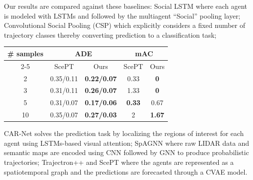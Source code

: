 \documentclass{article}
\begin{document}
% 
\label{sec:result}
Our results are compared against these baselines: Social LSTM \cite{7780479} where each agent is modeled with LSTMs and followed by the multiagent “Social” pooling layer; Convolutional Social Pooling (CSP) \cite{Deo_2018} which explicitly considers a fixed number of trajectory classes thereby converting prediction to a classification task;
  \begin{table}\vspace{-8pt}
 \begin{threeparttable}
    \begin{tabular}{ccccc}
   
\toprule
\multirow{ 2}{*}{\# samples}  &
\multicolumn{2}{c}{ADE} & \multicolumn{2}{c}{mAC}\\
\cmidrule{2-5}
 & ScePT  & Ours & ScePT  & Ours\\
\midrule

 2 &
0.35/0.11 & \textbf{0.22/0.07} & 0.33  & \textbf{0} \\



 3 &
0.31/0.11 & \textbf{0.26/0.07} & 1.33  & \textbf{0} 


\\
 5 & 0.31/0.07 & \textbf{0.17/0.06} &
\textbf{0.33}  & 0.67
\\ 10 & 0.35/0.07 & \textbf{0.27/0.03}
& 2 &\textbf{ 1.67}
\\

\bottomrule
\end{tabular}
\label{table:results}

\end{threeparttable}\vspace{-10pt}
\end{table}
 CAR-Net \cite{sadeghian2018carnet} solves the prediction task by localizing the regions of interest for each agent using LSTMs-based visual attention; SpAGNN \cite{casas2019spatiallyaware} where raw LIDAR data and semantic maps are encoded using CNN followed by GNN to produce probabilistic trajectories; Trajectron++ \cite{salzmann2021trajectron} and ScePT \cite{chen2022scept} where the agents are represented as a spatiotemporal graph and the predictions are forecasted through a CVAE model. 
\end{document}
